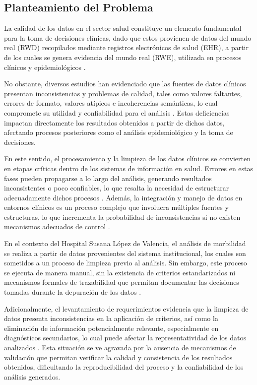\documentclass[12pt, letterpaper, oneside]{article}
\begin{document}
\subsection{Planteamiento del Problema}

La calidad de los datos en el sector salud constituye un elemento fundamental para la toma de decisiones clínicas, dado que estos provienen de datos del mundo real (RWD) recopilados mediante registros electrónicos de salud (EHR), a partir de los cuales se genera evidencia del mundo real (RWE), utilizada en procesos clínicos y epidemiológicos \parencite{lighterness_data_2024}.

No obstante, diversos estudios han evidenciado que las fuentes de datos clínicos presentan inconsistencias y problemas de calidad, tales como valores faltantes, errores de formato, valores atípicos e incoherencias semánticas, lo cual compromete su utilidad y confiabilidad para el análisis \parencite{ben_scalable_2024}. Estas deficiencias impactan directamente los resultados obtenidos a partir de dichos datos, afectando procesos posteriores como el análisis epidemiológico y la toma de decisiones.

En este sentido, el procesamiento y la limpieza de los datos clínicos se convierten en etapas críticas dentro de los sistemas de información en salud. Errores en estas fases pueden propagarse a lo largo del análisis, generando resultados inconsistentes o poco confiables, lo que resalta la necesidad de estructurar adecuadamente dichos procesos \parencite{albu_challenges_2025}. Además, la integración y manejo de datos en entornos clínicos es un proceso complejo que involucra múltiples fuentes y estructuras, lo que incrementa la probabilidad de inconsistencias si no existen mecanismos adecuados de control \parencite{petri_clinical_2025}.

En el contexto del Hospital Susana López de Valencia, el análisis de morbilidad se realiza a partir de datos provenientes del sistema institucional, los cuales son sometidos a un proceso de limpieza previo al análisis. Sin embargo, este proceso se ejecuta de manera manual, sin la existencia de criterios estandarizados ni mecanismos formales de trazabilidad que permitan documentar las decisiones tomadas durante la depuración de los datos \parencite{Procedimiento_Morbilidad_HSLV}.

Adicionalmente, el levantamiento de requerimientos evidencia que la limpieza de datos presenta inconsistencias en la aplicación de criterios, así como la eliminación de información potencialmente relevante, especialmente en diagnósticos secundarios, lo cual puede afectar la representatividad de los datos analizados \parencite{SRS_Morbilidad_2026}. Esta situación se ve agravada por la ausencia de mecanismos de validación que permitan verificar la calidad y consistencia de los resultados obtenidos, dificultando la reproducibilidad del proceso y la confiabilidad de los análisis generados.
\end{document}
